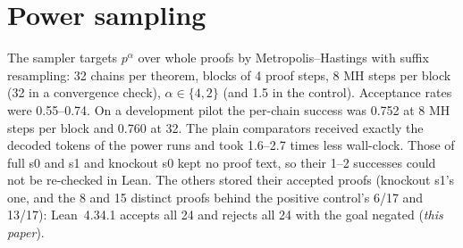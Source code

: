 \section{Power sampling}
\label{app:power}
The sampler targets $p^\alpha$ over whole proofs by Metropolis--Hastings with suffix resampling: 32 chains per theorem,
blocks of 4 proof steps, 8 MH steps per block (32 in a convergence check), $\alpha \in \{4, 2\}$ (and 1.5 in the
control). Acceptance rates were 0.55--0.74. On a development pilot the per-chain success was 0.752 at 8 MH steps per
block and 0.760 at 32. The plain comparators received exactly the decoded tokens of the power runs and took 1.6--2.7
times less wall-clock. Those of full s0 and s1 and knockout s0 kept no proof text, so their 1--2 successes could not be re-checked in Lean.
The others stored their accepted proofs (knockout s1's one, and the 8 and 15 distinct proofs behind the positive
control's 6/17 and 13/17): Lean~4.34.1 accepts all 24 and rejects all 24 with the goal negated (\emph{this paper}).

